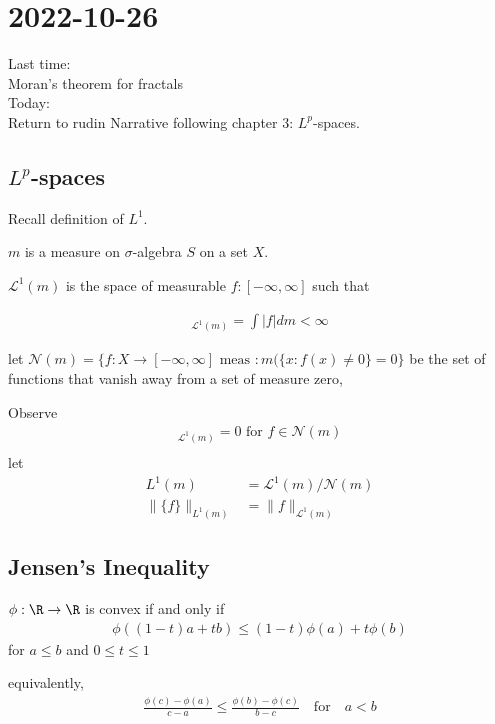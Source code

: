 \section{2022-10-26}

\noindent
Last time: \\
Moran's theorem for fractals \\

\noindent
Today: \\
Return to rudin Narrative following chapter $3$: $L^{p}$-spaces.

\subsection{$L^{p}$-spaces}

Recall definition of $L^{1}$.

$m$ is a measure on $\sigma$-algebra $S$ on a set $X$.

$\mathcal{L}^{1}(m)$ is the space of measurable $f : [-\infty, \infty]$ such that

\begin{align*}
	[f]_{\mathcal{L}^{1}(m)} = \int |f| dm < \infty
\end{align*}

let $\mathcal{N}(m) = \{f : X \to [-\infty, \infty] \text{ meas }: m(\{x : f(x) \neq 0\} = 0\}$ be the set of functions that vanish away from a set of measure zero,

Observe
\begin{align*}
	[f]_{\mathcal{L}^1 (m) } = 0 \text{ for } f \in \mathcal{N}(m) \\
\end{align*} let
 \begin{align*}
	 L^{1} (m) &= \mathcal{L}^1 (m) / \mathcal{N} (m) \\
	 \|\{f\}\|_{L^1 (m) } &= \|f\|_{\mathcal{L}^1 (m) } 
\end{align*} 


\subsection{ Jensen's Inequality }
	
\begin{definition}[Convex]
	$\phi : \R \to \R$ is convex if and only if
	\begin{align*}
		\phi (( 1 - t) a + tb) \leq (1-t) \phi (a) + t \phi (b)
	\end{align*} for $a \leq b$ and $0 \leq t \leq 1$

	equivalently, 
	\begin{align*}
		\frac{\phi (c) - \phi (a)}{c - a} \leq \frac{\phi (b) - \phi (c)}{b - c} 
		\quad \text{for} \quad  a < b
	\end{align*} 
\end{definition}
	
